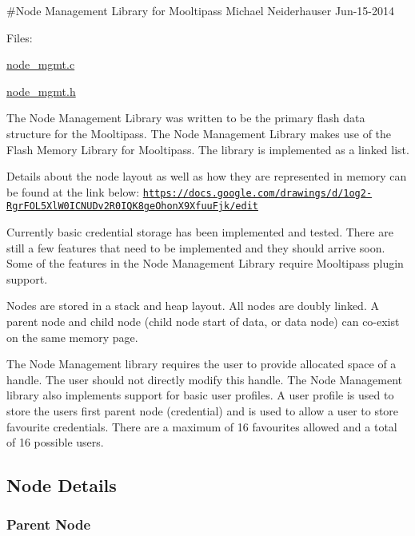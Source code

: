 \#\+Node Management Library for Mooltipass Michael Neiderhauser Jun-\/15-\/2014

Files\+:
\begin{DoxyItemize}
\item \hyperlink{node__mgmt_8c}{node\+\_\+mgmt.\+c}
\item \hyperlink{node__mgmt_8h}{node\+\_\+mgmt.\+h}
\end{DoxyItemize}

The Node Management Library was written to be the primary flash data structure for the Mooltipass. The Node Management Library makes use of the Flash Memory Library for Mooltipass. The library is implemented as a linked list.

Details about the node layout as well as how they are represented in memory can be found at the link below\+: \href{https://docs.google.com/drawings/d/1og2-RgrFOL5XlW0ICNUDv2R0IQK8geOhonX9XfuuFjk/edit}{\tt https\+://docs.\+google.\+com/drawings/d/1og2-\/\+Rgr\+F\+O\+L5\+Xl\+W0\+I\+C\+N\+U\+Dv2\+R0\+I\+Q\+K8ge\+Ohon\+X9\+Xfuu\+Fjk/edit}

Currently basic credential storage has been implemented and tested. There are still a few features that need to be implemented and they should arrive soon. Some of the features in the Node Management Library require Mooltipass plugin support.

Nodes are stored in a stack and heap layout. All nodes are doubly linked. A parent node and child node (child node start of data, or data node) can co-\/exist on the same memory page.

The Node Management library requires the user to provide allocated space of a handle. The user should not directly modify this handle. The Node Management library also implements support for basic user profiles. A user profile is used to store the users first parent node (credential) and is used to allow a user to store \textquotesingle{}favourite\textquotesingle{} credentials. There are a maximum of 16 favourites allowed and a total of 16 possible users.

\subsection*{Node Details}

\subsubsection*{Parent Node}

